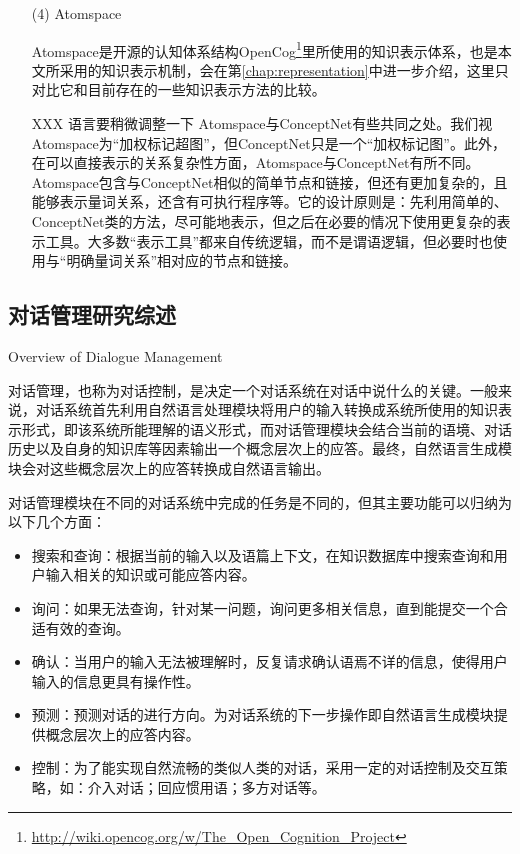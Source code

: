 \begin{enumerate}
\begin{description}
\end{description}


\item[(4)] {Atomspace}

Atomspace是开源的认知体系结构OpenCog\footnote{\url{http://wiki.opencog.org/w/The_Open_Cognition_Project}}里所使用的知识表示体系，也是本文所采用的知识表示机制，会在第\ref{chap:representation}中进一步介绍，这里只对比它和目前存在的一些知识表示方法的比较。

XXX 语言要稍微调整一下
Atomspace与ConceptNet有些共同之处。我们视Atomspace为“加权标记超图”，但ConceptNet只是一个“加权标记图”。此外，在可以直接表示的关系复杂性方面，Atomspace与ConceptNet有所不同。Atomspace包含与ConceptNet相似的简单节点和链接，但还有更加复杂的，且能够表示量词关系，还含有可执行程序等。它的设计原则是：先利用简单的、ConceptNet类的方法，尽可能地表示，但之后在必要的情况下使用更复杂的表示工具。大多数“表示工具”都来自传统逻辑，而不是谓语逻辑，但必要时也使用与“明确量词关系”相对应的节点和链接。

\end{enumerate}


\subsection{对话管理研究综述}{Overview of Dialogue Management}

对话管理，也称为对话控制，是决定一个对话系统在对话中说什么的关键。一般来说，对话系统首先利用自然语言处理模块将用户的输入转换成系统所使用的知识表示形式，即该系统所能理解的语义形式，而对话管理模块会结合当前的语境、对话历史以及自身的知识库等因素输出一个概念层次上的应答。最终，自然语言生成模块会对这些概念层次上的应答转换成自然语言输出。

对话管理模块在不同的对话系统中完成的任务是不同的，但其主要功能可以归纳为以下几个方面：

\begin{itemize}

\item 搜索和查询：根据当前的输入以及语篇上下文，在知识数据库中搜索查询和用户输入相关的知识或可能应答内容。
\item 询问：如果无法查询，针对某一问题，询问更多相关信息，直到能提交一个合适有效的查询。
\item 确认：当用户的输入无法被理解时，反复请求确认语焉不详的信息，使得用户输入的信息更具有操作性。
\item 预测：预测对话的进行方向。为对话系统的下一步操作即自然语言生成模块提供概念层次上的应答内容。
\item 控制：为了能实现自然流畅的类似人类的对话，采用一定的对话控制及交互策略，如：介入对话；回应惯用语；多方对话等。
\end{itemize}

